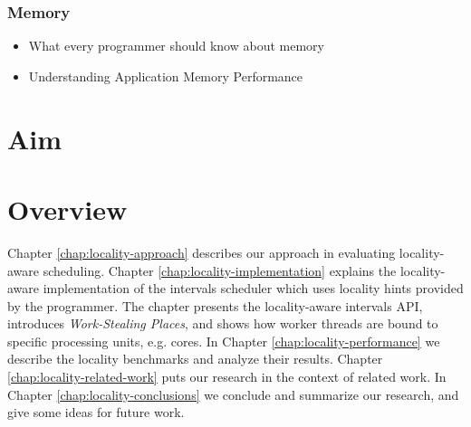 \subsubsection{Memory}
\label{sec:lr-memory}

\begin{itemize}
\item[\textbullet] What every programmer should know about memory
  \cite{Drepper2007}
\item[\textbullet] Understanding Application Memory Performance
  \cite{Drepper2008}
\end{itemize}

\section{Aim}
\label{sec:locality-intro-aim}


\section{Overview}
\label{sec:locality-intro-overview}

Chapter \ref{chap:locality-approach} describes our approach in
evaluating locality-aware scheduling. Chapter
\ref{chap:locality-implementation} explains the locality-aware
implementation of the intervals scheduler which uses locality hints
provided by the programmer. The chapter presents the locality-aware
intervals API, introduces \emph{Work-Stealing Places}, and shows how
worker threads are bound to specific processing units, e.g. cores.  In
Chapter \ref{chap:locality-performance} we describe the locality
benchmarks and analyze their results. Chapter
\ref{chap:locality-related-work} puts our research in the context of
related work. In Chapter \ref{chap:locality-conclusions} we conclude
and summarize our research, and give some ideas for future work.


